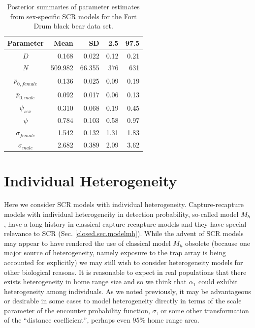 \begin{table}[ht]
\centering
\caption{Posterior summaries of parameter estimates from sex-specific SCR models for the Fort Drum black bear data set.}
\begin{tabular}{crrrr}
\hline \hline
Parameter & Mean & SD & 2.5 & 97.5 \\
\hline
$D$  &     0.168 & 0.022 & 0.12 & 0.21  \\
$N$   &   509.982 & 66.355 & 376 & 631 \\
$p_{0, female}$ & 0.136 & 0.025 & 0.09 & 0.19 \\
$p_{0, male}$ & 0.092 & 0.017 & 0.06 & 0.13 \\
$\psi_{sex}$ &  0.310 & 0.068 & 0.19 & 0.45 \\
$\psi$  & 0.784 & 0.103 & 0.58 & 0.97 \\
$\sigma_{female}$ & 1.542 &  0.132 & 1.31 & 1.83 \\
$\sigma_{male}$ & 2.682 & 0.389 & 2.09 & 3.62 \\ \hline
\end{tabular}
\label{covariates.tab.SCRsex}
\end{table}



\section{Individual Heterogeneity}

Here we consider SCR models with individual heterogeneity.
Capture-recapture models with individual
heterogeneity in detection probability, so-called model $M_{h}$, have
a long history in classical capture recapture models and they have
special relevance to SCR (Sec. \ref{closed.sec.modelmh}). 
While the advent of SCR models may appear to have rendered the use of
classical model $M_h$ obsolete (because one major source of heterogeneity, 
namely exposure to the trap array is being
accounted for explicitly) we may still wish to consider
heterogeneity models for other biological reasons.
It is reasonable
to expect in real populations that there exists
heterogeneity in home range size and so we think that $\alpha_{1}$
could exhibit heterogeneity among individuals.  As we noted
previously, it may be advantageous or desirable in some cases to model
heterogeneity directly in terms of the scale parameter of the encounter probability 
function, $\sigma$, or
some other transformation of the ``distance coefficient'', perhaps
even 95\% home range area.

